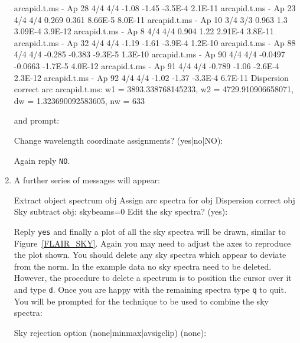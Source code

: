 \documentclass[chapters,twoside,11pt]{starlink}
\begin{document}
\begin{enumerate}
\begin{footnotesize}
  \begin{terminalv}
arcapid.t.ms - Ap 28    4/4     4/4       -1.08       -1.45  -3.5E-4 2.1E-11
arcapid.t.ms - Ap 23    4/4     4/4       0.269       0.361  8.66E-5 8.0E-11
arcapid.t.ms - Ap 10    3/4     3/3       0.963         1.3  3.09E-4 3.9E-12
arcapid.t.ms - Ap 8     4/4     4/4       0.904        1.22  2.91E-4 3.8E-11
arcapid.t.ms - Ap 32    4/4     4/4       -1.19       -1.61  -3.9E-4 1.2E-10
arcapid.t.ms - Ap 88    4/4     4/4      -0.285      -0.383  -9.3E-5 1.3E-10
arcapid.t.ms - Ap 90    4/4     4/4     -0.0497     -0.0663  -1.7E-5 4.0E-12
arcapid.t.ms - Ap 91    4/4     4/4      -0.789       -1.06  -2.6E-4 2.3E-12
arcapid.t.ms - Ap 92    4/4     4/4       -1.02       -1.37  -3.3E-4 6.7E-11
Dispersion correct arc arcapid.t.ms: w1 = 3893.338768145233, w2 = 4729.910906658071, dw =
1.323690092583605, nw = 633
\end{terminalv}
\end{footnotesize}

   and prompt:

\begin{terminalv}
Change wavelength coordinate assignments? (yes|no|NO):
\end{terminalv}

   Again reply \texttt{NO}.

  \item A further series of messages will appear:

\begin{terminalv}
Extract object spectrum obj
Assign arc spectra for obj
Dispersion correct obj
Sky subtract obj:  skybeams=0
Edit the sky spectra? (yes):
\end{terminalv}

   Reply \texttt{yes} and finally a plot of all the sky spectra will be
   drawn, similar to Figure~\ref{FLAIR_SKY}.  Again you may need to adjust
   the axes to reproduce the plot shown.  You should delete any sky spectra
   which appear to deviate from the norm.  In the example data no sky spectra
   need to be deleted.  However, the procedure to delete a spectrum is to
   position the cursor over it and type \texttt{d}.  Once you are happy with
   the remaining spectra type \texttt{q} to quit.  You will be prompted for the
   technique to be used to combine the sky spectra:

\begin{terminalv}
Sky rejection option (none|minmax|avsigclip) (none):
\end{terminalv}


\end{enumerate}
\end{document}

